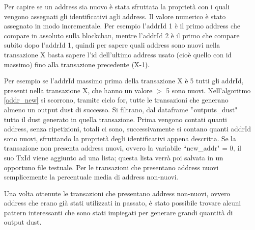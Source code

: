 Per capire se un address sia nuovo è stata sfruttata la proprietà con i quali vengono assegnati gli identificativi agli address. Il valore numerico è stato assegnato in modo incrementale. Per esempio l’addrId 1 è il primo address che compare in assoluto sulla blockchan, mentre l’addrId 2 è il primo che compare subito dopo l’addrId 1, quindi per sapere quali address sono nuovi nella transazione X basta sapere l'id dell'ultimo address usato (cioè quello con id massimo) fino alla transazione precedente (X-1). 

Per esempio se l'addrId massimo prima della transazione X è 5 tutti gli addrId, presenti nella transazione X, che hanno un valore $>$ 5 sono nuovi. Nell'algoritmo \ref{addr_new} si scorrono, tramite ciclo for, tutte le transazioni che generano almeno un output dust di successo. Si filtrano, dal dataframe ''outputs\_dust" tutto il dust generato in quella transazione. Prima vengono contati quanti address, senza ripetizioni, totali ci sono, successivamente si contano quanti addrId sono nuovi, sfruttando la proprietà degli identificativi appena descritta. Se la transazione non presenta address nuovi, ovvero la variabile ``new\_addr" = 0, il suo TxId viene aggiunto ad una lista; questa lista verrà poi salvata in un opportuno file testuale. Per le transazioni che presentano address nuovi semplicemente la percentuale media di address non-nuovi.


Una volta ottenute le transazioni che presentano address non-nuovi, ovvero address che erano già stati utilizzati in passato, è stato possibile trovare alcuni pattern interessanti che sono stati impiegati per generare grandi quantità di output dust. 
